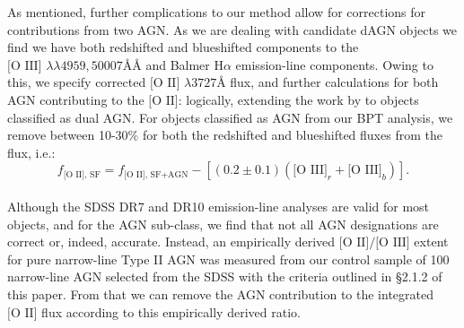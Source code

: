 As mentioned, further complications to our method allow for corrections for contributions from two AGN. As we are dealing with candidate dAGN objects we find we have both redshifted and blueshifted components to the $\text{[O III] }\lambda\lambda4959,50007ÅÅ$ and Balmer $\text{H}\alpha$ emission-line components. Owing to this, we specify corrected $\text{[O II] }\lambda3727Å$ flux, and further calculations for both AGN contributing to the $\text{[O II]}$: logically, extending the work by \cite{2006ApJ...642..702K} to objects classified as dual AGN. For objects classified as AGN from our BPT analysis, we remove between 10-30\% for both the redshifted and blueshifted \text{[O III]} fluxes from the \text{[O II]} flux, i.e.:
\\
\begin{equation}
\label{eq:KimCorrection}
f_{\text{[O II], SF}}=f_{\text{[O II], SF+AGN}}-\left[(0.2\pm{0.1})(\text{[O III]}_r+\text{[O III]}_b)\right].
\end{equation}
\\
Although the SDSS DR7 and DR10 emission-line analyses are valid for most objects, and for the AGN sub-class, we find that not all AGN designations are correct or, indeed, accurate. Instead, an empirically derived $\text{[O II]}/\text{[O III]}$ extent for pure narrow-line Type II AGN was measured from our control sample of 100 narrow-line AGN selected from the SDSS with the criteria outlined in §2.1.2 of this paper. From that we can remove the AGN contribution to the integrated $\text{[O II]}$ flux according to this empirically derived ratio.

